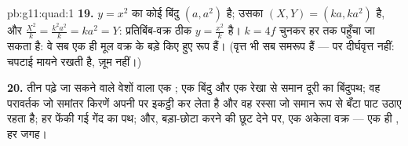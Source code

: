 \begin{solution}{pb:g11:quad:1}
\textbf{19.} $y = x^2$ का कोई बिंदु $(a, a^2)$ है; उसका  $(X, Y) = (ka, ka^2)$ है, और $\frac{X^2}{k} = \frac{k^2a^2}{k} =
ka^2 = Y$:
प्रतिबिंब-वक्र ठीक $y = \frac{x^2}{k}$ है। $k = 4f$ चुनकर हर  तक पहुँचा जा सकता है: वे
सब एक ही मूल वक्र के बड़े किए हुए रूप हैं। (वृत्त भी सब समरूप हैं --- पर
दीर्घवृत्त नहीं: चपटाई मायने रखती है, ज़ूम नहीं।)

\textbf{20.} तीन पढ़े जा सकने वाले वेशों वाला एक ; एक बिंदु और एक रेखा
से समान दूरी का बिंदुपथ; वह परावर्तक जो समांतर किरणें अपनी  पर इकट्ठी कर
लेता है और वह रस्सा जो समान रूप से बँटा पाट उठाए रहता है; हर फेंकी गई गेंद का
पथ; और, बड़ा-छोटा करने की छूट देने पर, एक अकेला वक्र --- एक ही , हर
जगह।
\end{solution}
